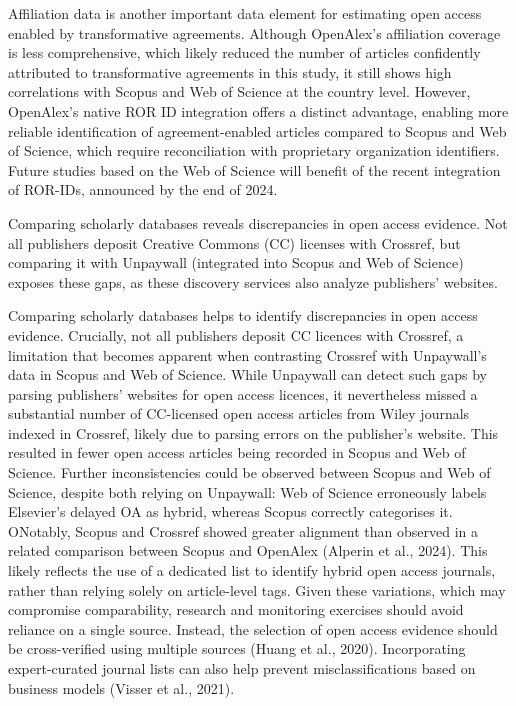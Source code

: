 \documentclass[a4paper,man,floatsintext,longtable,noextraspace,10pt]{apa6}
\begin{document}
Affiliation data is another important data element for estimating open
access enabled by transformative agreements. Although OpenAlex's
affiliation coverage is less comprehensive, which likely reduced the
number of articles confidently attributed to transformative agreements
in this study, it still shows high correlations with Scopus and Web of
Science at the country level. However, OpenAlex's native ROR ID
integration offers a distinct advantage, enabling more reliable
identification of agreement-enabled articles compared to Scopus and Web
of Science, which require reconciliation with proprietary organization
identifiers. Future studies based on the Web of Science will benefit of
the recent integration of ROR-IDs, announced by the end of 2024.

Comparing scholarly databases reveals discrepancies in open access
evidence. Not all publishers deposit Creative Commons (CC) licenses with
Crossref, but comparing it with Unpaywall (integrated into Scopus and
Web of Science) exposes these gaps, as these discovery services also
analyze publishers' websites.

Comparing scholarly databases helps to identify discrepancies in open
access evidence. Crucially, not all publishers deposit CC licences with
Crossref, a limitation that becomes apparent when contrasting Crossref
with Unpaywall's data in Scopus and Web of Science. While Unpaywall can
detect such gaps by parsing publishers' websites for open access
licences, it nevertheless missed a substantial number of CC-licensed
open access articles from Wiley journals indexed in Crossref, likely due
to parsing errors on the publisher's website. This resulted in fewer
open access articles being recorded in Scopus and Web of Science.
Further inconsistencies could be observed between Scopus and Web of
Science, despite both relying on Unpaywall: Web of Science erroneously
labels Elsevier's delayed OA as hybrid, whereas Scopus correctly
categorises it. ONotably, Scopus and Crossref showed greater alignment
than observed in a related comparison between Scopus and OpenAlex
(Alperin et al., 2024). This likely reflects the use of a dedicated list
to identify hybrid open access journals, rather than relying solely on
article-level tags. Given these variations, which may compromise
comparability, research and monitoring exercises should avoid reliance
on a single source. Instead, the selection of open access evidence
should be cross-verified using multiple sources (Huang et al., 2020).
Incorporating expert-curated journal lists can also help prevent
misclassifications based on business models (Visser et al., 2021).
\end{document}
